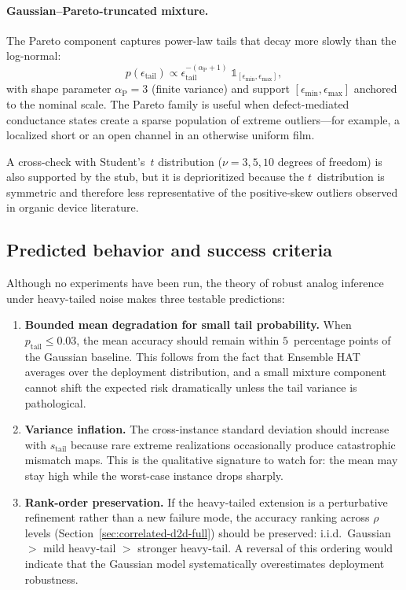 \paragraph{Gaussian--Pareto-truncated mixture.}  The Pareto component captures power-law tails that decay more slowly than the log-normal:
\begin{equation}
    p(\epsilon_{\text{tail}}) \propto \epsilon_{\text{tail}}^{-(\alpha_{\text{P}}+1)} \; \mathbb{1}_{[\epsilon_{\min}, \epsilon_{\max}]},
    \label{eq:pareto-mixture}
\end{equation}
with shape parameter $\alpha_{\text{P}} = 3$ (finite variance) and support $[\epsilon_{\min}, \epsilon_{\max}]$ anchored to the nominal scale.  The Pareto family is useful when defect-mediated conductance states create a sparse population of extreme outliers---for example, a localized short or an open channel in an otherwise uniform film.

A cross-check with Student's~$t$ distribution ($\nu = 3, 5, 10$ degrees of freedom) is also supported by the stub, but it is deprioritized because the $t$~distribution is symmetric and therefore less representative of the positive-skew outliers observed in organic device literature.

\subsection{Predicted behavior and success criteria}

Although no experiments have been run, the theory of robust analog inference under heavy-tailed noise makes three testable predictions:
\begin{enumerate}
    \item \textbf{Bounded mean degradation for small tail probability.}  When $p_{\text{tail}} \le 0.03$, the mean accuracy should remain within $5$~percentage points of the Gaussian baseline.  This follows from the fact that Ensemble HAT averages over the deployment distribution, and a small mixture component cannot shift the expected risk dramatically unless the tail variance is pathological.
    \item \textbf{Variance inflation.}  The cross-instance standard deviation should increase with $s_{\text{tail}}$ because rare extreme realizations occasionally produce catastrophic mismatch maps.  This is the qualitative signature to watch for: the mean may stay high while the worst-case instance drops sharply.
    \item \textbf{Rank-order preservation.}  If the heavy-tailed extension is a perturbative refinement rather than a new failure mode, the accuracy ranking across $\rho$ levels (Section~\ref{sec:correlated-d2d-full}) should be preserved: i.i.d.~Gaussian $>$ mild heavy-tail $>$ stronger heavy-tail.  A reversal of this ordering would indicate that the Gaussian model systematically overestimates deployment robustness.
\end{enumerate}

